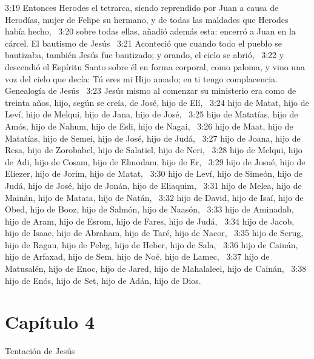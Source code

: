 3:19 Entonces Herodes el tetrarca, siendo reprendido por Juan a causa de Herodías, mujer de Felipe su hermano, y de todas las maldades que Herodes había hecho,  
3:20 sobre todas ellas, añadió además esta: encerró a Juan en la cárcel. 
El bautismo de Jesús   
3:21 Aconteció que cuando todo el pueblo se bautizaba, también Jesús fue bautizado; y orando, el cielo se abrió,  
3:22 y descendió el Espíritu Santo sobre él en forma corporal, como paloma, y vino una voz del cielo que decía: Tú eres mi Hijo amado; en ti tengo complacencia. 
Genealogía de Jesús   
3:23 Jesús mismo al comenzar su ministerio era como de treinta años, hijo, según se creía, de José, hijo de Elí,  
3:24 hijo de Matat, hijo de Leví, hijo de Melqui, hijo de Jana, hijo de José,  
3:25 hijo de Matatías, hijo de Amós, hijo de Nahum, hijo de Esli, hijo de Nagai,  
3:26 hijo de Maat, hijo de Matatías, hijo de Semei, hijo de José, hijo de Judá,  
3:27 hijo de Joana, hijo de Resa, hijo de Zorobabel, hijo de Salatiel, hijo de Neri,  
3:28 hijo de Melqui, hijo de Adi, hijo de Cosam, hijo de Elmodam, hijo de Er,  
3:29 hijo de Josué, hijo de Eliezer, hijo de Jorim, hijo de Matat,  
3:30 hijo de Leví, hijo de Simeón, hijo de Judá, hijo de José, hijo de Jonán, hijo de Eliaquim,  
3:31 hijo de Melea, hijo de Mainán, hijo de Matata, hijo de Natán,  
3:32 hijo de David, hijo de Isaí, hijo de Obed, hijo de Booz, hijo de Salmón, hijo de Naasón,  
3:33 hijo de Aminadab, hijo de Aram, hijo de Esrom, hijo de Fares, hijo de Judá,  
3:34 hijo de Jacob, hijo de Isaac, hijo de Abraham, hijo de Taré, hijo de Nacor,  
3:35 hijo de Serug, hijo de Ragau, hijo de Peleg, hijo de Heber, hijo de Sala,  
3:36 hijo de Cainán, hijo de Arfaxad, hijo de Sem, hijo de Noé, hijo de Lamec,  
3:37 hijo de Matusalén, hijo de Enoc, hijo de Jared, hijo de Mahalaleel, hijo de Cainán,  
3:38 hijo de Enós, hijo de Set, hijo de Adán, hijo de Dios.  
\section*{Capítulo 4}
Tentación de Jesús   

